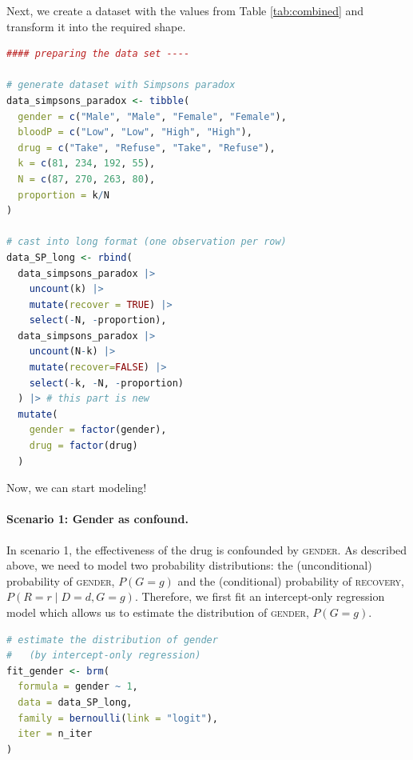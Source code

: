 \documentclass[nobib]{tufte-handout}
\begin{document}
\vspace{-0.5cm}
Next, we create a dataset with the values from Table \ref{tab:combined} and transform it into the required shape.

\begin{minipage}[]{\textwidth}
\begin{lstlisting}[language=R]
#### preparing the data set ----

# generate dataset with Simpsons paradox
data_simpsons_paradox <- tibble(
  gender = c("Male", "Male", "Female", "Female"),
  bloodP = c("Low", "Low", "High", "High"),
  drug = c("Take", "Refuse", "Take", "Refuse"),
  k = c(81, 234, 192, 55),
  N = c(87, 270, 263, 80),
  proportion = k/N
)

# cast into long format (one observation per row)
data_SP_long <- rbind(
  data_simpsons_paradox |>
    uncount(k) |>
    mutate(recover = TRUE) |>
    select(-N, -proportion),
  data_simpsons_paradox |>
    uncount(N-k) |>
    mutate(recover=FALSE) |>
    select(-k, -N, -proportion)
  ) |> # this part is new
  mutate(
    gender = factor(gender),
    drug = factor(drug)
  )
\end{lstlisting}
\end{minipage}

\vspace{-0.5cm}
Now, we can start modeling!

\paragraph{Scenario 1: Gender as confound.}
In scenario 1, the effectiveness of the drug is confounded by \textsc{gender}.
As described above, we need to model two probability distributions:
the (unconditional) probability of \textsc{gender}, $P\left( G=g \right)$ and
the (conditional) probability of \textsc{recovery}, $P\left(R = r \mid D=d, G=g \right)$.
Therefore, we first fit an intercept-only regression model which allows us to estimate the distribution of \textsc{gender}, $P\left( G=g \right)$.

\begin{minipage}[]{\textwidth}
\begin{lstlisting}[language=R]
# estimate the distribution of gender
#   (by intercept-only regression)
fit_gender <- brm(
  formula = gender ~ 1,
  data = data_SP_long,
  family = bernoulli(link = "logit"),
  iter = n_iter
)
\end{lstlisting}
\end{minipage}
\end{document}
